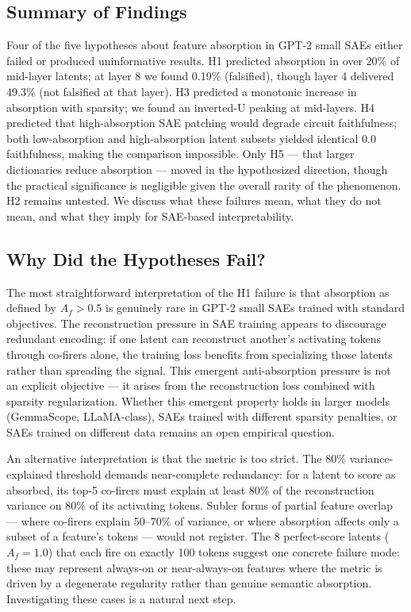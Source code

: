 \documentclass{article}
\begin{document}
\subsection{Summary of Findings}

Four of the five hypotheses about feature absorption in GPT-2 small SAEs either failed or produced uninformative results. H1 predicted absorption in over 20\% of mid-layer latents; at layer 8 we found 0.19\% (falsified), though layer 4 delivered 49.3\% (not falsified at that layer). H3 predicted a monotonic increase in absorption with sparsity; we found an inverted-U peaking at mid-layers. H4 predicted that high-absorption SAE patching would degrade circuit faithfulness; both low-absorption and high-absorption latent subsets yielded identical 0.0 faithfulness, making the comparison impossible. Only H5 --- that larger dictionaries reduce absorption --- moved in the hypothesized direction, though the practical significance is negligible given the overall rarity of the phenomenon. H2 remains untested. We discuss what these failures mean, what they do not mean, and what they imply for SAE-based interpretability.

\subsection{Why Did the Hypotheses Fail?}

The most straightforward interpretation of the H1 failure is that absorption as defined by $A_f > 0.5$ is genuinely rare in GPT-2 small SAEs trained with standard objectives. The reconstruction pressure in SAE training appears to discourage redundant encoding: if one latent can reconstruct another's activating tokens through co-firers alone, the training loss benefits from specializing those latents rather than spreading the signal. This emergent anti-absorption pressure is not an explicit objective --- it arises from the reconstruction loss combined with sparsity regularization. Whether this emergent property holds in larger models (GemmaScope, LLaMA-class), SAEs trained with different sparsity penalties, or SAEs trained on different data remains an open empirical question.

An alternative interpretation is that the metric is too strict. The 80\% variance-explained threshold demands near-complete redundancy: for a latent to score as absorbed, its top-5 co-firers must explain at least 80\% of the reconstruction variance on 80\% of its activating tokens. Subler forms of partial feature overlap --- where co-firers explain 50--70\% of variance, or where absorption affects only a subset of a feature's tokens --- would not register. The 8 perfect-score latents ($A_f = 1.0$) that each fire on exactly 100 tokens suggest one concrete failure mode: these may represent always-on or near-always-on features where the metric is driven by a degenerate regularity rather than genuine semantic absorption. Investigating these cases is a natural next step.
\end{document}
